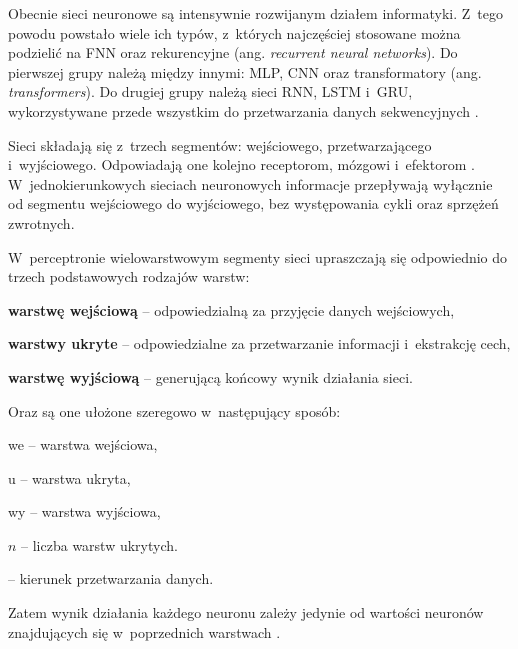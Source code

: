 Obecnie sieci neuronowe są intensywnie
rozwijanym działem informatyki.
Z~tego powodu powstało wiele ich typów,
z~których najczęściej stosowane można
podzielić na \gls{FNN} oraz rekurencyjne
(ang. \textit{recurrent neural networks}).
Do pierwszej grupy należą między innymi:
\gls{MLP},
\gls{CNN}
oraz transformatory (ang. \textit{transformers}).
Do drugiej grupy należą sieci RNN, LSTM i~GRU,
wykorzystywane przede wszystkim
do przetwarzania danych sekwencyjnych%
.

Sieci składają się z~trzech segmentów:
wejściowego, przetwarzającego i~wyjściowego.
Odpowiadają one kolejno receptorom, mózgowi i~efektorom%
.
W~jednokierunkowych sieciach neuronowych
informacje przepływają wyłącznie
od segmentu wejściowego do wyjściowego,
bez występowania cykli oraz sprzężeń zwrotnych.

W~perceptronie wielowarstwowym
segmenty sieci upraszczają się odpowiednio
do trzech podstawowych rodzajów warstw:
\begin{nospitemize}
  \item \textbf{warstwę wejściową}
    -- odpowiedzialną za przyjęcie danych wejściowych,
  \item \textbf{warstwy ukryte}
    -- odpowiedzialne za przetwarzanie informacji
    i~ekstrakcję cech,
  \item \textbf{warstwę wyjściową}
    -- generującą końcowy wynik działania sieci.
\end{nospitemize}
Oraz są one ułożone szeregowo w~następujący sposób:\\

\begin{nospitemize}
  \item we -- warstwa wejściowa,
  \item u -- warstwa ukryta,
  \item wy -- warstwa wyjściowa,
  \item $n$ -- liczba warstw ukrytych.
  \item {} -- kierunek przetwarzania danych.
\end{nospitemize}
{\setlength{\parskip}{0pt}
Zatem wynik działania
każdego neuronu zależy jedynie
od wartości neuronów znajdujących się
w~poprzednich warstwach%
.
}

